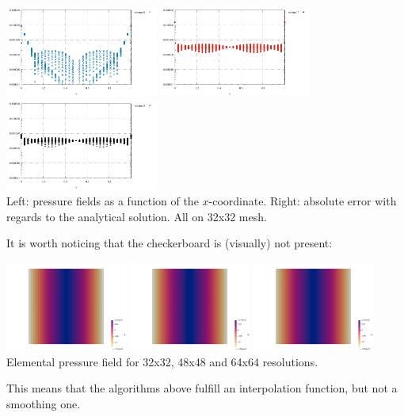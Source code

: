 \begin{center}
\includegraphics[width=5cm]{python_codes/fieldstone_12/results/reg/q6_error}
\includegraphics[width=5cm]{python_codes/fieldstone_12/results/reg/q7_error}
\includegraphics[width=5cm]{python_codes/fieldstone_12/results/reg/q8_error}\\
{\captionfont Left: pressure fields as a function of the $x$-coordinate. 
Right: absolute error with regards to the analytical solution. All on 32x32 mesh.}
\end{center}

It is worth noticing that the checkerboard is (visually) not present:
\begin{center}
\includegraphics[width=4cm]{python_codes/fieldstone_12/results/reg/p32}
\includegraphics[width=4cm]{python_codes/fieldstone_12/results/reg/p48}
\includegraphics[width=4cm]{python_codes/fieldstone_12/results/reg/p64}\\
{\captionfont Elemental pressure field for 32x32, 48x48 and 64x64 resolutions.}
\end{center}
This means that the algorithms above fulfill an interpolation function, but not a smoothing one.

